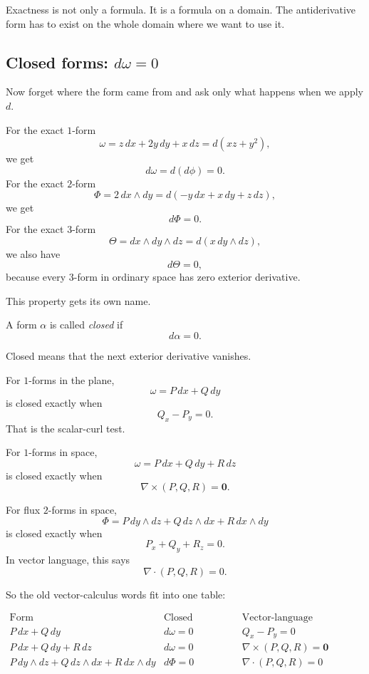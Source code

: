 Exactness is not only a formula.  It is a formula on a domain.  The antiderivative form
has to exist on the whole domain where we want to use it.

\subsection{Closed forms: \texorpdfstring{\(d\omega=0\)}{d omega = 0}}

Now forget where the form came from and ask only what happens when we apply \(d\).

For the exact \(1\)-form
\[
    \omega=z\,dx+2y\,dy+x\,dz=d(xz+y^2),
\]
we get
\[
    d\omega=d(d\phi)=0.
\]
For the exact \(2\)-form
\[
    \Phi=2\,dx\wedge dy=d(-y\,dx+x\,dy+z\,dz),
\]
we get
\[
    d\Phi=0.
\]
For the exact \(3\)-form
\[
    \Theta=dx\wedge dy\wedge dz=d(x\,dy\wedge dz),
\]
we also have
\[
    d\Theta=0,
\]
because every \(3\)-form in ordinary space has zero exterior derivative.

This property gets its own name.

\begin{definition}
A form \(\alpha\) is called \emph{closed} if
\[
\boxed{
    d\alpha=0.
}
\]
\end{definition}

Closed means that the next exterior derivative vanishes.

For \(1\)-forms in the plane,
\[
    \omega=P\,dx+Q\,dy
\]
is closed exactly when
\[
\boxed{
    Q_x-P_y=0.
}
\]
That is the scalar-curl test.

For \(1\)-forms in space,
\[
    \omega=P\,dx+Q\,dy+R\,dz
\]
is closed exactly when
\[
\boxed{
    \nabla\times(P,Q,R)=\mathbf 0.
}
\]

For flux \(2\)-forms in space,
\[
    \Phi=P\,dy\wedge dz+Q\,dz\wedge dx+R\,dx\wedge dy
\]
is closed exactly when
\[
\boxed{
    P_x+Q_y+R_z=0.
}
\]
In vector language, this says
\[
\boxed{
    \nabla\cdot(P,Q,R)=0.
}
\]

So the old vector-calculus words fit into one table:

\[
\begin{array}{c|c|c}
\text{Form} & \text{Closed condition} & \text{Vector-language translation} \\ \hline
P\,dx+Q\,dy & d\omega=0 & Q_x-P_y=0\\[1mm]
P\,dx+Q\,dy+R\,dz & d\omega=0 & \nabla\times(P,Q,R)=\mathbf 0\\[1mm]
P\,dy\wedge dz+Q\,dz\wedge dx+R\,dx\wedge dy & d\Phi=0 &
\nabla\cdot(P,Q,R)=0
\end{array}
\]

